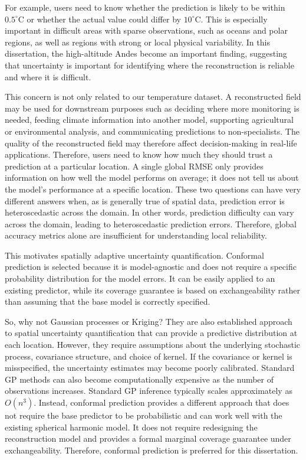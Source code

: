 \documentclass[11pt,a4paper]{report}
\begin{document}
For example, users need to know whether the prediction is likely to be within $0.5^\circ\mathrm{C}$ or whether the actual value could differ by $10^\circ\mathrm{C}$. This is especially important in difficult areas with sparse observations, such as oceans and polar regions, as well as regions with strong or local physical variability. In this dissertation, the high-altitude Andes become an important finding, suggesting that uncertainty is important for identifying where the reconstruction is reliable and where it is difficult.

This concern is not only related to our temperature dataset. A reconstructed field may be used for downstream purposes such as deciding where more monitoring is needed, feeding climate information into another model, supporting agricultural or environmental analysis, and communicating predictions to non-specialists. The quality of the reconstructed field may therefore affect decision-making in real-life applications. Therefore, users need to know how much they should trust a prediction at a particular location. A single global RMSE only provides information on how well the model performs on average; it does not tell us about the model's performance at a specific location. These two questions can have very different answers when, as is generally true of spatial data, prediction error is heteroscedastic across the domain. In other words, prediction difficulty can vary across the domain, leading to heteroscedastic prediction errors. Therefore, global accuracy metrics alone are insufficient for understanding local reliability.

This motivates spatially adaptive uncertainty quantification. Conformal prediction is selected because it is model-agnostic and does not require a specific probability distribution for the model errors. It can be easily applied to an existing predictor, while its coverage guarantee is based on exchangeability rather than assuming that the base model is correctly specified.

So, why not Gaussian processes or Kriging? They are also established approach to spatial uncertainty quantification that can provide a predictive distribution at each location. However, they require assumptions about the underlying stochastic process, covariance structure, and choice of kernel. If the covariance or kernel is misspecified, the uncertainty estimates may become poorly calibrated. Standard GP methods can also become computationally expensive as the number of observations increases. Standard GP inference typically scales approximately as $O(n^3)$. Instead, conformal prediction provides a different approach that does not require the base predictor to be probabilistic and can work well with the existing spherical harmonic model. It does not require redesigning the reconstruction model and provides a formal marginal coverage guarantee under exchangeability. Therefore, conformal prediction is preferred for this dissertation.
\end{document}
